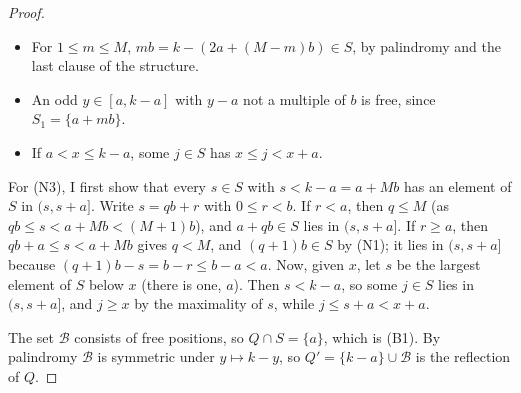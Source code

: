 \begin{proof}
\begin{itemize}
\item[(N1)] For $1\le m\le M$, $mb=k-(2a+(M-m)b)\in S$, by palindromy and
the last clause of the structure.
\item[(N2)] An odd $y\in[a,k-a]$ with $y-a$ not a multiple of $b$ is free,
since $S_1=\{a+mb\}$.
\item[(N3)] If $a<x\le k-a$, some $j\in S$ has $x\le j<x+a$.
\end{itemize}
For (N3), I first show that every $s\in S$ with $s<k-a=a+Mb$ has an
element of $S$ in $(s,s+a]$. Write $s=qb+r$ with $0\le r<b$. If $r<a$,
then $q\le M$ (as $qb\le s<a+Mb<(M+1)b$), and $a+qb\in S$ lies in
$(s,s+a]$. If $r\ge a$, then $qb+a\le s<a+Mb$ gives $q<M$, and
$(q+1)b\in S$ by (N1); it lies in $(s,s+a]$ because
$(q+1)b-s=b-r\le b-a<a$. Now, given $x$, let $s$ be the largest element
of $S$ below $x$ (there is one, $a$). Then $s<k-a$, so some $j\in S$ lies in
$(s,s+a]$, and $j\ge x$ by the maximality of $s$, while $j\le s+a<x+a$.

The set $\mathcal B$ consists of free positions, so $Q\cap S=\{a\}$, which is (B1).
By palindromy $\mathcal B$ is symmetric under $y\mapsto k-y$, so $Q'=\{k-a\}\cup \mathcal B$ is
the reflection of $Q$.


\end{proof}
